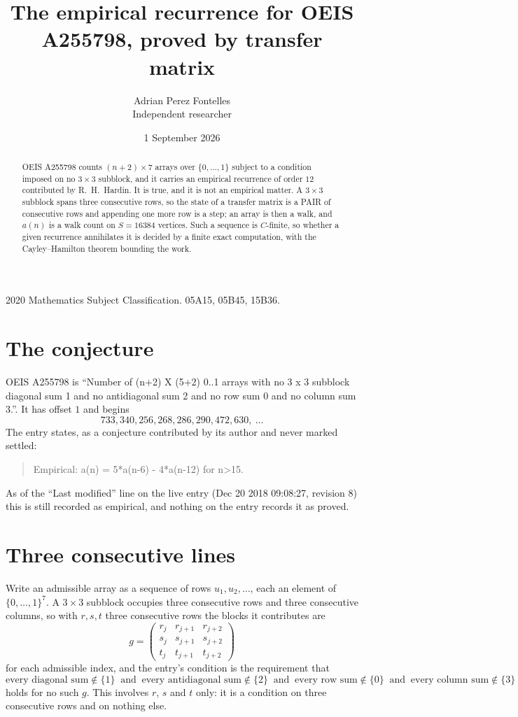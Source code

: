 \documentclass[11pt,a4paper]{article}
\title{The empirical recurrence for OEIS A255798, proved by transfer matrix}
\author{Adrian Perez Fontelles\\ \small Independent researcher}
\date{1 September 2026}
\theoremstyle{plain}
\theoremstyle{definition}
\begin{document}
\maketitle

\begin{abstract}
OEIS A255798 counts $(n+2)\times7$ arrays over $\{0,\dots,1\}$ subject to a condition imposed on
no $3\times3$ subblock, and it carries an empirical recurrence of order $12$
contributed by R.~H.~Hardin. It is true, and it is not an empirical matter. A $3\times3$
subblock spans three consecutive rows, so the state of a transfer matrix is a PAIR of
consecutive rows and appending one more row is a step; an array is then a walk, and
$a(n)$ is a walk count on $S=16384$ vertices. Such a sequence is $C$-finite, so whether a given
recurrence annihilates it is decided by a finite exact computation, with the Cayley--Hamilton
theorem bounding the work.
\end{abstract}

\noindent\small 2020 Mathematics Subject Classification. 05A15, 05B45, 15B36.\normalsize

\section{The conjecture}

OEIS A255798 is ``Number of (n+2) X (5+2) 0..1 arrays with no 3 x 3 subblock diagonal sum 1 and no antidiagonal sum 2 and no row sum 0 and no column sum 3.''. It has offset $1$ and begins
\[
733, 340, 256, 268, 286, 290, 472, 630,\ \dots
\]
The entry states, as a conjecture contributed by its author and never marked settled:
\begin{quote}
Empirical: a(n) = 5*a(n-6) - 4*a(n-12) for n>15.
\end{quote}
As of the ``Last modified'' line on the live entry (Dec 20 2018 09:08:27, revision 8) this is still
recorded as empirical, and nothing on the entry records it as proved.

\section{Three consecutive lines}

Write an admissible array as a sequence of rows $u_1,u_2,\dots$, each an element of
$\{0,\dots,1\}^{7}$. A $3\times3$ subblock occupies three consecutive rows and
three consecutive columns, so with $r,s,t$ three consecutive rows the blocks it
contributes are
\[
g=\begin{pmatrix}r_j&r_{j+1}&r_{j+2}\\ s_j&s_{j+1}&s_{j+2}\\ t_j&t_{j+1}&t_{j+2}\end{pmatrix}
\]
for each admissible index, and the entry's condition is the requirement that
\[
\text{every diagonal sum} \notin \{1\}\ \text{ and }\ \text{every antidiagonal sum} \notin \{2\}\ \text{ and }\ \text{every row sum} \notin \{0\}\ \text{ and }\ \text{every column sum} \notin \{3\}
\]
holds for no such $g$. This involves $r$, $s$ and $t$ only: it is a condition on
three consecutive rows and on nothing else.
\end{document}

